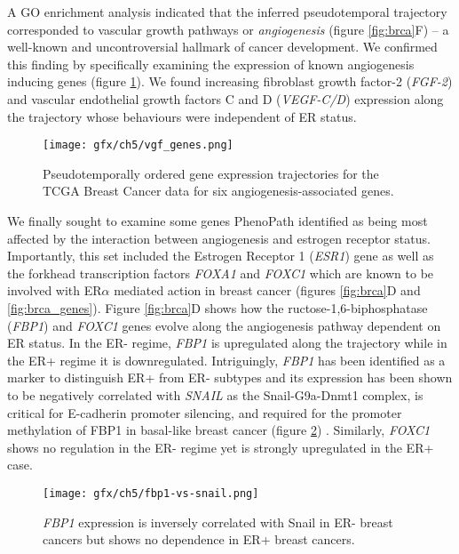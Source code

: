 A GO enrichment analysis indicated that the inferred pseudotemporal trajectory corresponded to vascular growth pathways or \emph{angiogenesis} (figure \ref{fig:brca}F) -- a well-known and uncontroversial hallmark of cancer development.\cite{ferrara2002vegf,welti2013recent} We confirmed this finding by specifically examining the expression of known angiogenesis inducing genes (figure \ref{fig:vgf_genes}). We found increasing fibroblast growth factor-2 (\emph{FGF-2}) and vascular endothelial growth factors C and D (\emph{VEGF-C/D}) expression along the trajectory whose behaviours were independent of ER status.

\begin{figure}
   \texttt{[image: gfx/ch5/vgf\_genes.png]}
   \caption{Pseudotemporally ordered gene expression trajectories for the TCGA Breast Cancer data for six angiogenesis-associated genes.}
	\label{fig:vgf_genes}
\end{figure}

We finally sought to examine some genes PhenoPath identified as being most affected by the interaction between angiogenesis and estrogen receptor status.
Importantly, this set included the Estrogen Receptor 1 (\emph{ESR1})
gene as well as the forkhead transcription factors \emph{FOXA1} and \emph{FOXC1} which are known to be involved with ER$\alpha$ mediated action in breast cancer \cite{lam2013forkhead,yu2016foxc1} (figures \ref{fig:brca}D and \ref{fig:brca_genes}).
Figure \ref{fig:brca}D shows how the  ructose-1,6-biphosphatase (\emph{FBP1}) and \emph{FOXC1} genes evolve along the angiogenesis pathway dependent on ER status. In the ER- regime, \emph{FBP1} is upregulated along the trajectory while in the ER+ regime it is downregulated. Intriguingly, \emph{FBP1} has been identified as a marker to distinguish ER+ from ER- subtypes and its expression has been shown to be negatively correlated with \emph{SNAIL} as the Snail-G9a-Dnmt1 complex, is critical for E-cadherin promoter silencing, and required for the promoter methylation of FBP1 in basal-like breast cancer (figure \ref{fig:fbp1-vs-snail}) \cite{dong2013loss}. Similarly, \emph{FOXC1} shows no regulation in the ER- regime yet is strongly upregulated in the ER+ case.

\begin{figure}
  \centering
   \texttt{[image: gfx/ch5/fbp1-vs-snail.png]}
   \caption{\emph{FBP1} expression is inversely correlated with Snail in ER- breast cancers but shows no dependence in ER+ breast cancers.}
	\label{fig:fbp1-vs-snail}
\end{figure}

